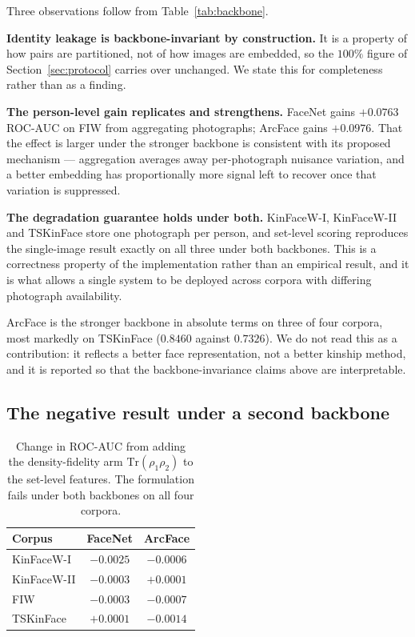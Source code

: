 \documentclass[preprint,12pt]{elsarticle}
\begin{document}
Three observations follow from Table~\ref{tab:backbone}.

\textbf{Identity leakage is backbone-invariant by construction.} It is a
property of how pairs are partitioned, not of how images are embedded, so the
$100\%$ figure of Section~\ref{sec:protocol} carries over unchanged. We state this
for completeness rather than as a finding.

\textbf{The person-level gain replicates and strengthens.} FaceNet gains
$+0.0763$ ROC-AUC on FIW from aggregating photographs; ArcFace gains
$+0.0976$. That the effect is larger under the stronger backbone is consistent
with its proposed mechanism --- aggregation averages away per-photograph
nuisance variation, and a better embedding has proportionally more signal left
to recover once that variation is suppressed.

\textbf{The degradation guarantee holds under both.} KinFaceW-I, KinFaceW-II
and TSKinFace store one photograph per person, and set-level scoring reproduces
the single-image result exactly on all three under both backbones. This is a
correctness property of the implementation rather than an empirical result, and
it is what allows a single system to be deployed across corpora with differing
photograph availability.

ArcFace is the stronger backbone in absolute terms on three of four corpora,
most markedly on TSKinFace ($0.8460$ against $0.7326$). We do not read this as
a contribution: it reflects a better face representation, not a better kinship
method, and it is reported so that the backbone-invariance claims above are
interpretable.

\subsection{The negative result under a second backbone}

\begin{table}[t]
\centering
\caption{Change in ROC-AUC from adding the density-fidelity arm
$\mathrm{Tr}(\rho_1\rho_2)$ to the set-level features. The formulation fails
under both backbones on all four corpora.}
\label{tab:backbone_quantum}
\begin{tabular}{lcc}
\toprule
Corpus & FaceNet & ArcFace \\
\midrule
KinFaceW-I & $-0.0025$ & $-0.0006$ \\
KinFaceW-II & $-0.0003$ & $+0.0001$ \\
FIW & $-0.0003$ & $-0.0007$ \\
TSKinFace & $+0.0001$ & $-0.0014$ \\
\bottomrule
\end{tabular}
\end{table}
\end{document}
